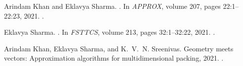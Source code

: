 
\frontmatter







\let\oldbibname\bibname
\renewcommand{\bibname}{Publications based on this Thesis}

\begin{thebibliography}{1}

Arindam Khan and Eklavya Sharma.
.
\newblock In {\em APPROX}, volume 207, pages 22:1--22:23, 2021.
\newblock \href {https://doi.org/10.4230/LIPIcs.APPROX/RANDOM.2021.22}
  {}.

Eklavya Sharma.
.
\newblock In {\em FSTTCS}, volume 213, pages 32:1--32:22, 2021.
\newblock \href {https://doi.org/10.4230/LIPIcs.FSTTCS.2021.32}
  {}.

Arindam Khan, Eklavya Sharma, and K.~V.~N. Sreenivas.
\newblock Geometry meets vectors: Approximation algorithms for multidimensional
  packing, 2021.
\newblock \href {http://arxiv.org/abs/2106.13951} {}.

\end{thebibliography}

\renewcommand{\bibname}{\oldbibname}
